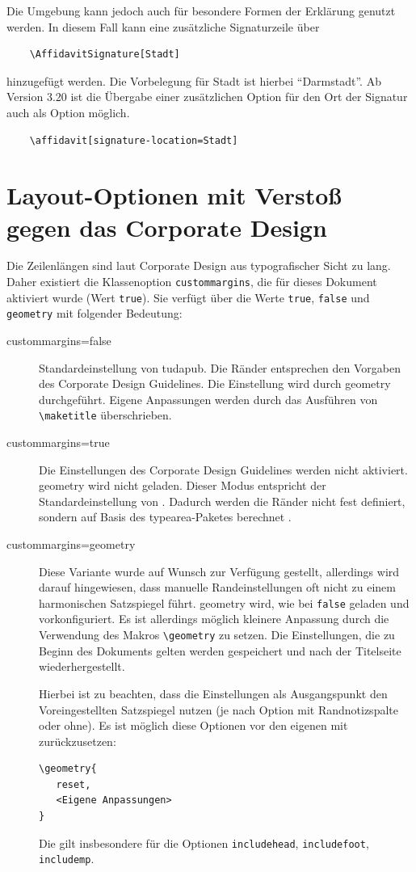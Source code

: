 \documentclass[
	german,%
	accentcolor=9c,%
	ruledheaders=section,%
	class=report,%
	thesis={type=bachelor},%
	fontsize=11pt,%
	parskip=half-,%
	custommargins=true,%
	marginpar=false,%
]{tudapub}
\newcommand*{\code}[1]{\texttt{#1}}
\newcommand*{\pkg}[1]{\textsf{#1}}
\newcommand*{\cls}[1]{\textsf{#1}}
\begin{document}
Die Umgebung kann jedoch auch für besondere Formen der Erklärung genutzt werden. In diesem Fall kann eine zusätzliche Signaturzeile über
\begin{verbatim}
    \AffidavitSignature[Stadt]
\end{verbatim}
hinzugefügt werden. Die Vorbelegung für Stadt ist hierbei \enquote{Darmstadt}.
Ab Version 3.20 ist die Übergabe einer zusätzlichen Option für den Ort der Signatur auch als Option möglich.

\begin{verbatim}
    \affidavit[signature-location=Stadt]
\end{verbatim}

\section{Layout-Optionen mit Verstoß gegen das Corporate Design}

Die Zeilenlängen sind laut Corporate Design aus typografischer Sicht zu lang.
Daher existiert die Klassenoption \code{custommargins}, die für dieses Dokument aktiviert wurde (Wert \code{true}). Sie verfügt über die Werte \code{true}, \code{false} und \code{geometry} mit folgender Bedeutung:

\begin{description}
	\item[custommargins=false] Standardeinstellung von \cls{tudapub}. Die Ränder entsprechen den Vorgaben des Corporate Design Guidelines. Die Einstellung wird durch \pkg{geometry} durchgeführt. Eigene Anpassungen werden durch das Ausführen von \code{\textbackslash{}maketitle} überschrieben.
	\item[custommargins=true] Die Einstellungen des Corporate Design Guidelines werden nicht aktiviert. \pkg{geometry} wird nicht geladen. Dieser Modus entspricht der Standardeinstellung von \KOMAScript{}. Dadurch werden die Ränder nicht fest definiert, sondern auf Basis des \pkg{typearea}-Paketes berechnet \cite[vgl.][]{scrguide}.
	\item[custommargins=geometry]  Diese Variante wurde auf Wunsch zur Verfügung gestellt, allerdings wird darauf hingewiesen, dass manuelle Randeinstellungen oft nicht zu einem harmonischen Satzspiegel führt.
	      \pkg{geometry} wird, wie bei \code{false} geladen und vorkonfiguriert. Es ist allerdings möglich kleinere Anpassung durch die Verwendung des Makros \code{\textbackslash{}geometry} zu setzen. Die Einstellungen, die zu Beginn des Dokuments gelten werden gespeichert und nach der Titelseite wiederhergestellt.

	      Hierbei ist zu beachten, dass die Einstellungen als Ausgangspunkt den Voreingestellten Satzspiegel nutzen (je nach Option mit Randnotizspalte oder ohne). Es ist möglich diese Optionen vor den eigenen mit zurückzusetzen:
\begin{verbatim}
\geometry{
   reset,
   <Eigene Anpassungen>
}
\end{verbatim}
	      Die gilt insbesondere für die Optionen \code{includehead}, \code{includefoot}, \code{includemp}.
\end{description}
\end{document}
